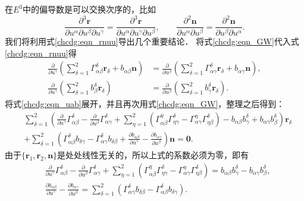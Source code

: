 在$E^3$中的偏导数是可以交换次序的，比如
\begin{equation}\label{chcdg:eqn_rnuu}
    \frac{\partial^3 \boldsymbol{r}}{\partial u^\alpha \partial u^\beta \partial u^\gamma}
    =\frac{\partial^3 \boldsymbol{r}}{\partial u^\alpha \partial u^\gamma \partial u^\beta  },\qquad
    \frac{\partial^2 \boldsymbol{n}}{\partial u^\alpha \partial u^\beta }
    =\frac{\partial^2 \boldsymbol{n}}{\partial u^\beta \partial u^\alpha  } .
\end{equation}
我们将利用式\eqref{chcdg:eqn_rnuu}导出几个重要结论．
将式\eqref{chcdg:eqn_GW}代入式\eqref{chcdg:eqn_rnuu}得
\begin{align}
    \frac{\partial}{\partial u^\gamma}\left(\sum_{\delta=1}^{2}\Gamma_{\alpha \beta}^\delta \boldsymbol{r}_\delta 
    +b_{\alpha \beta}\boldsymbol{n}\right)    & =\frac{\partial}{\partial u^\beta}
    \left(\sum_{\delta=1}^{2} \Gamma_{\alpha \gamma}^\delta \boldsymbol{r}_\delta
    +b_{\alpha \gamma} \boldsymbol{n}\right), \label{chcdg:eqn_uab}  \\
    \frac{\partial}{\partial u^\gamma}\left(\sum_{\delta=1}^{2} b_\beta^\delta \boldsymbol{r}_\delta\right) 
    & =\frac{\partial}{\partial u^\beta}\left(\sum_{\delta=1}^{2} b_\gamma^\delta \boldsymbol{r}_\delta\right) . \label{chcdg:eqn_nab}
\end{align}
将式\eqref{chcdg:eqn_uab}展开，并且再次用式\eqref{chcdg:eqn_GW}，整理之后得到：
\begin{align*}
    &\sum_{\delta=1}^{2}\left(\frac{\partial}{\partial u^\gamma} \Gamma_{\alpha \beta}^\delta
    -\frac{\partial}{\partial u^\beta} \Gamma_{\alpha \gamma}^\delta
    + \sum_{\eta=1}^{2}\left(\Gamma_{\alpha \beta}^\eta \Gamma_{\eta \gamma}^\delta
    -\Gamma_{\alpha \gamma}^\eta \Gamma_{\eta \beta}^\delta\right)
    -b_{\alpha \beta} b_\gamma^\delta+b_{\alpha \gamma} b_\beta^\delta\right) \boldsymbol{r}_\delta  \\
    &+\sum_{\delta=1}^{2}\left(\Gamma_{\alpha \beta}^\delta b_{\delta \gamma}-\Gamma_{\alpha \gamma}^\delta
     b_{\delta \beta}+\frac{\partial b_{\alpha \beta}}{\partial u^\gamma}
     -\frac{\partial b_{\alpha \gamma}}{\partial u^\beta}\right) \boldsymbol{n}=\boldsymbol{0} .
\end{align*}
由于$\{\boldsymbol{r}_1, \boldsymbol{r}_2, \boldsymbol{n}\}$是处处线性无关的，所以上式的系数必须为零，即有
\begin{align}
    &\frac{\partial}{\partial u^\gamma} \Gamma_{\alpha \beta}^\delta-\frac{\partial}{\partial u^\beta}
   \Gamma_{\alpha \gamma}^\delta+ \sum_{\eta=1}^{2}\left(\Gamma_{\alpha \beta}^\eta 
    \Gamma_{\eta \gamma}^\delta-\Gamma_{\alpha \gamma}^\eta \Gamma_{\eta \beta}^\delta\right)
    =b_{\alpha \beta} b_\gamma^\delta-b_{\alpha \gamma} b_\beta^\delta, \label{chcdg:eqn_Gauss} \\
    &\frac{\partial b_{\alpha \beta}}{\partial u^\gamma}-\frac{\partial b_{\alpha \gamma}}{\partial u^\beta}
    =\sum_{\delta=1}^{2}\left(\Gamma_{\alpha \gamma}^\delta b_{\delta \beta}
    - \Gamma_{\alpha \beta}^\delta b_{\delta \gamma}\right).     \label{chcdg:eqn_Codazzi}
\end{align}
